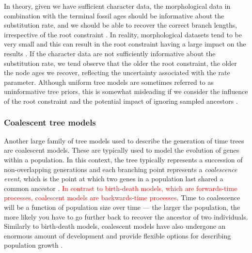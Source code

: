 \documentclass[11pt]{article}
\newcommand{\edit}[1]{{\textcolor{red}{#1}}} %
\newcommand{\aw}[1]{{\textcolor{armygreen}{[AW: #1]}}} %
\begin{document}
In theory, given we have sufficient character data, the morphological %
data in combination with the terminal fossil ages should be informative about the substitution rate, and we should be able to recover the correct branch lengths, irrespective of the root constraint \cite{Ronquist2012a,Klopfstein2019}.
In reality, morphological datasets tend to be very small and this can result in the root constraint having a large impact on the results \cite{matzke2016}.
If the character data are not sufficiently informative about the substitution rate, we tend observe that the older the root constraint, the older the node ages we recover, reflecting the uncertainty associated with the rate parameter.
Although uniform tree models are sometimes referred to as uninformative tree priors, this is somewhat misleading if we consider the influence of the root constraint and the potential impact of ignoring sampled ancestors \cite{Gavryushkina2014}.

\subsubsection{Coalescent tree models}
Another large family of tree models used to describe the generation of time trees are coalescent models. These are typically used to model the evolution of genes within a population. 
In this context, the tree typically represents a succession of non-overlapping generations and each branching point represents a \textit{coalescence event}, which is the point at which two genes in a population last shared a common ancestor \cite{Kingman1982}.
\edit{In contrast to birth-death models, which are forwards-time processes, coalescent models are backwards-time processes.}
Time to coalescence will be a function of population size over time --- the larger the population, the more likely you have to go further back to recover the ancestor of two individuals. %
Similarly to birth-death models, coalescent models have also undergone an enormous amount of development and provide flexible options for describing population growth \cite{Beerli2001, Drummond2005, Mashayekhi2019}. %
\end{document}

